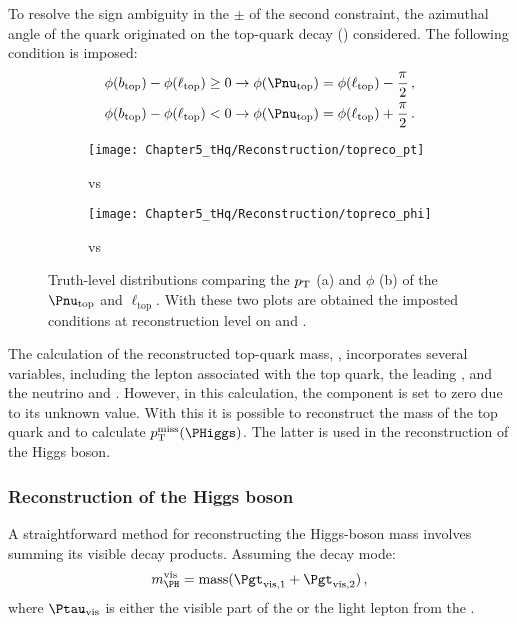 To resolve the sign ambiguity in the $\pm$ of the second constraint, the azimuthal 
angle of the \Pbottom quark originated on the top-quark decay (\phibtop) considered. 
The following condition is imposed:
\begin{align*}
  \phibtop-\philtop \geq 0 & \rightarrow \phinutop=\philtop-\frac{\pi}{2}\,,\\
  \phibtop-\philtop < 0  & \rightarrow \phinutop=\philtop+\frac{\pi}{2}\, .
\end{align*}


\begin{figure}[h] 
	\begin{subfigure}{0.49\textwidth}
	\texttt{[image: Chapter5\_tHq/Reconstruction/topreco\_pt]}
	\caption{\pnutopT vs \pltopT}
	\label{fig:tHq:EventReconstruction:TopSystem:hypothesis2:pt}
	\end{subfigure}
\hfill 
	\begin{subfigure}{0.49\textwidth}
	\texttt{[image: Chapter5\_tHq/Reconstruction/topreco\_phi]}
	\caption{\phinutop vs \philtop}
	\label{fig:tHq:EventReconstruction:TopSystem:hypothesis2:phi}
	\end{subfigure}
\caption{Truth-level distributions comparing the $p_{\text{T}}$ (a) and $\phi$ (b) of the $\Pnu_{\text{top}}$ and  $\ell_{\text{top}}$.
With these two plots are obtained the imposted conditions at reconstruction level on \pnutopT and \phinutop.} 
\label{fig:tHq:EventReconstruction:TopSystem:Reco}
\end{figure}


The calculation of the reconstructed top-quark mass, \toprecomass, incorporates several 
variables, including the lepton associated with the top quark, the leading \bjet, and the 
neutrino \pnutopT and \phinutop. However, in this calculation, the \pnutopz
component is set to zero due to its unknown value.
With this it is possible to reconstruct the mass of the top quark and
to calculate $\pT^{\text{miss}}(\PHiggs)$. The latter is used in the reconstruction
of the Higgs boson. 

\subsubsection{Reconstruction of the Higgs boson}
\label{sec:ChaptH:Sig:EventReconstruction:Higgs}
A straightforward method for reconstructing the Higgs-boson mass involves 
summing its visible decay products. Assuming the \Htautau decay mode:
\begin{equation*}
\Hvismass = \text{mass}(\Pgt_{\text{vis}, 1} + \Pgt_{\text{vis}, 2}) \, ,
\end{equation*}
where $\tauvis$ is either the visible part of the \tauhad
or the light lepton from the \taulep.

